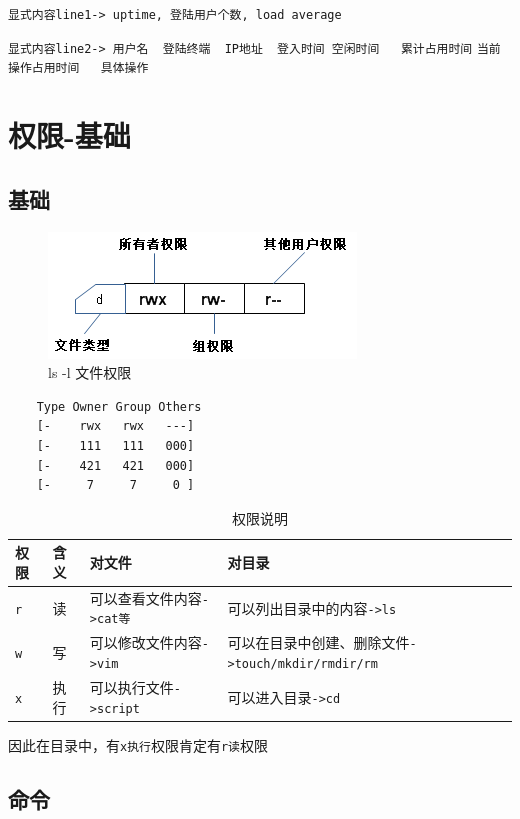 \documentclass[UTF8,a4paper,12pt]{ctexbook}
\begin{document}
				\verb|显式内容line1-> uptime, 登陆用户个数, load average|
			
				\verb|显式内容line2-> 用户名  登陆终端  IP地址  登入时间 空闲时间   累计占用时间|
					\verb|当前操作占用时间   具体操作|
	\section{权限-基础}
		\subsection{基础}
		\begin{figure}[h]
			\centering
			\includegraphics[scale = 1]{figure/fileDescription.png}
			\caption{ls -l 文件权限}
		\end{figure}
		
		\begin{lstlisting}
	Type Owner Group Others
	[-    rwx   rwx   ---]
	[-    111   111   000]
	[-    421   421   000]
	[-     7     7     0 ]
		\end{lstlisting}
		
		\begin{table}[H]
			\centering
			\caption{权限说明}
			\begin{tabular}{m{1cm}|m{1cm}|m{6cm}|m{6cm}}
				\toprule[1.5pt]
				权限	   	  & 含义  & 对文件 &  对目录 \\
				\hline
				\verb|r |	& 读   & 可以查看文件内容\verb|->cat等|& 可以列出目录中的内容\verb|->ls|\\
				\verb|w	|	& 写   & 可以修改文件内容\verb|->vim|& 可以在目录中创建、删除文件\verb|->touch/mkdir/rmdir/rm|\\
				\verb|x	|	& 执行 & 可以执行文件\verb|->script| & 可以进入目录\verb|->cd|\\
				\bottomrule[1.5pt]
			\end{tabular}
		\end{table}	
		
		因此在目录中，有\verb|x执行|权限肯定有\verb|r读|权限
		
	\subsection{命令}
\end{document}
